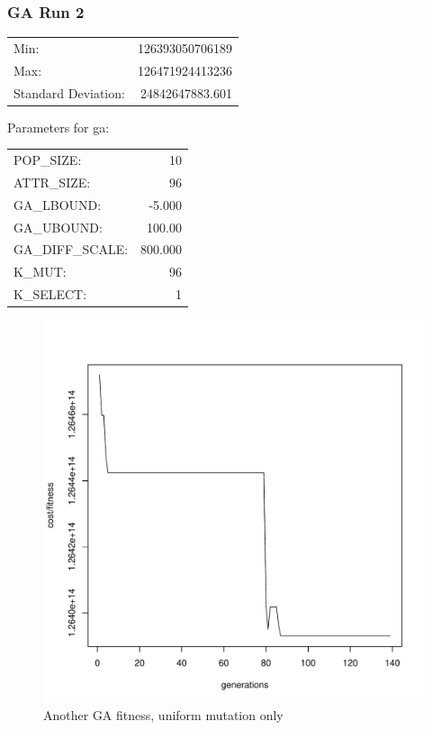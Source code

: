 \pagebreak
\subsubsection{GA Run 2}
\begin{tabular}{lr}
	Min: 			& 126393050706189   \\
	Max:			& 126471924413236   \\
	Standard Deviation:	& 24842647883.601  \\
\end{tabular}


Parameters for ga:\\
\begin{tabular}{lr}
	POP\_SIZE:	& 10 \\
	ATTR\_SIZE:	& 96 \\
	GA\_LBOUND:	& -5.000 \\
	GA\_UBOUND:	& 100.00 \\
	GA\_DIFF\_SCALE: & 800.000 \\
	K\_MUT:		& 96 \\
	K\_SELECT:	& 1 \\
\end{tabular}

\begin{figure}[!h]
	\begin{center}
		\includegraphics[width=120mm]{output/ga02/graph.pdf}
               	\caption{Another GA fitness, uniform mutation only}
                \label{saXX_exc}
        \end{center}
\end{figure}


